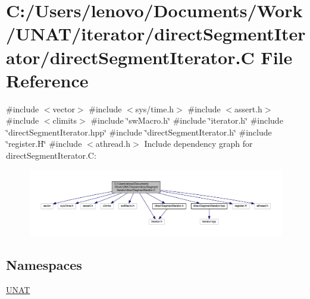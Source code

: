 \hypertarget{iterator_2directSegmentIterator_2directSegmentIterator_8C}{}\section{C\+:/\+Users/lenovo/\+Documents/\+Work/\+U\+N\+A\+T/iterator/direct\+Segment\+Iterator/direct\+Segment\+Iterator.C File Reference}
\label{iterator_2directSegmentIterator_2directSegmentIterator_8C}
{\ttfamily \#include $<$vector$>$}\newline
{\ttfamily \#include $<$sys/time.\+h$>$}\newline
{\ttfamily \#include $<$assert.\+h$>$}\newline
{\ttfamily \#include $<$climits$>$}\newline
{\ttfamily \#include \char`\"{}sw\+Macro.\+h\char`\"{}}\newline
{\ttfamily \#include \char`\"{}iterator.\+h\char`\"{}}\newline
{\ttfamily \#include \char`\"{}direct\+Segment\+Iterator.\+hpp\char`\"{}}\newline
{\ttfamily \#include \char`\"{}direct\+Segment\+Iterator.\+h\char`\"{}}\newline
{\ttfamily \#include \char`\"{}register.\+H\char`\"{}}\newline
{\ttfamily \#include $<$athread.\+h$>$}\newline
Include dependency graph for direct\+Segment\+Iterator.\+C\+:
\nopagebreak
\begin{figure}[H]
\begin{center}
\leavevmode
\includegraphics[width=350pt]{iterator_2directSegmentIterator_2directSegmentIterator_8C__incl}
\end{center}
\end{figure}
\subsection*{Namespaces}
\begin{DoxyCompactItemize}
\item 
 \mbox{\hyperlink{namespaceUNAT}{U\+N\+AT}}
\end{DoxyCompactItemize}
